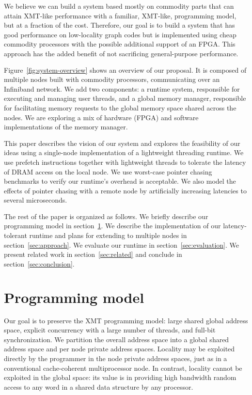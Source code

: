 \documentclass[10pt,nocopyrightspace]{sigplanconf}
\begin{document}
We believe we can build a system based mostly on commodity parts that
can attain {\small XMT}-like performance with a familiar, {\small
  XMT}-like, programming model, but at a fraction of the
cost. Therefore, our goal is to build a system that has good
performance on low-locality graph codes but is implemented using cheap
commodity processors with the possible additional support of an FPGA. This
approach has the added benefit of not sacrificing general-purpose
performance.

Figure~\ref{fig:system-overview} shows an overview of our proposal. It
is composed of multiple nodes built with commodity processors,
communicating over an Infiniband network. We add two components: a
runtime system, responsible for executing and managing user threads,
and a global memory manager, responsible for facilitating memory
requests to the global memory space shared across the nodes.
We are exploring a mix of hardware (FPGA) and software implementations
of the memory manager.
 
This paper describes the vision of our system and explores the
feasibility of our ideas using a single-node implementation of a
lightweight threading runtime. We use prefetch instructions together
with lightweight threads to tolerate the latency of DRAM access on the
local node. We use worst-case pointer chasing benchmarks to
verify our runtime's overhead is acceptable. We also model the effects
of pointer chasing with a remote node by artificially increasing
latencies to several microseconds.
 
The rest of the paper is organized as follows. We briefly describe our
programming model in section~\ref{sec:model}. We describe the
implementation of our latency-tolerant runtime and plans for extending
to multiple nodes in section~\ref{sec:approach}. We evaluate our
runtime in section~\ref{sec:evaluation}.  We present related work in
section~\ref{sec:related} and conclude in
section~\ref{sec:conclusion}.


\section{Programming model}
\label{sec:model}

Our goal is to preserve the {\small XMT} programming model: large shared global
address space, explicit concurrency with a large number of threads,
and full-bit synchronization.  We partition the overall address
space into a global shared address space and per node private address
spaces. Locality may be exploited directly by the programmer in the
node private address spaces, just as in a conventional cache-coherent
multiprocessor node. In contrast, locality cannot be exploited in the
global space: its value is in providing high bandwidth random access
to any word in a shared data structure by any processor.
\end{document}
